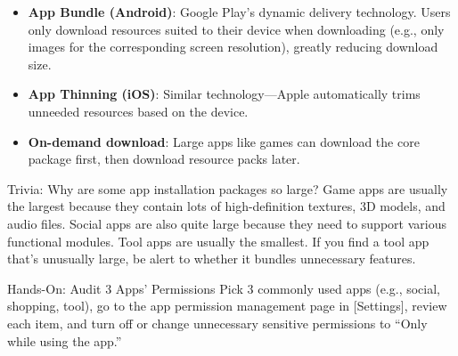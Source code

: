 \begin{itemize}
  \item \textbf{App Bundle (Android)}: Google Play's dynamic delivery technology. Users only download resources suited to their device when downloading (e.g., only images for the corresponding screen resolution), greatly reducing download size.
  \item \textbf{App Thinning (iOS)}: Similar technology—Apple automatically trims unneeded resources based on the device.
  \item \textbf{On-demand download}: Large apps like games can download the core package first, then download resource packs later.
\end{itemize}

\begin{tcbinfo}{Trivia: Why are some app installation packages so large?}
Game apps are usually the largest because they contain lots of high-definition textures, 3D models, and audio files. Social apps are also quite large because they need to support various functional modules. Tool apps are usually the smallest. If you find a tool app that's unusually large, be alert to whether it bundles unnecessary features.

\end{tcbinfo}

\begin{tcbpractice}{Hands-On: Audit 3 Apps' Permissions}
Pick 3 commonly used apps (e.g., social, shopping, tool), go to the app permission management page in [Settings], review each item, and turn off or change unnecessary sensitive permissions to “Only while using the app.”

\end{tcbpractice}
